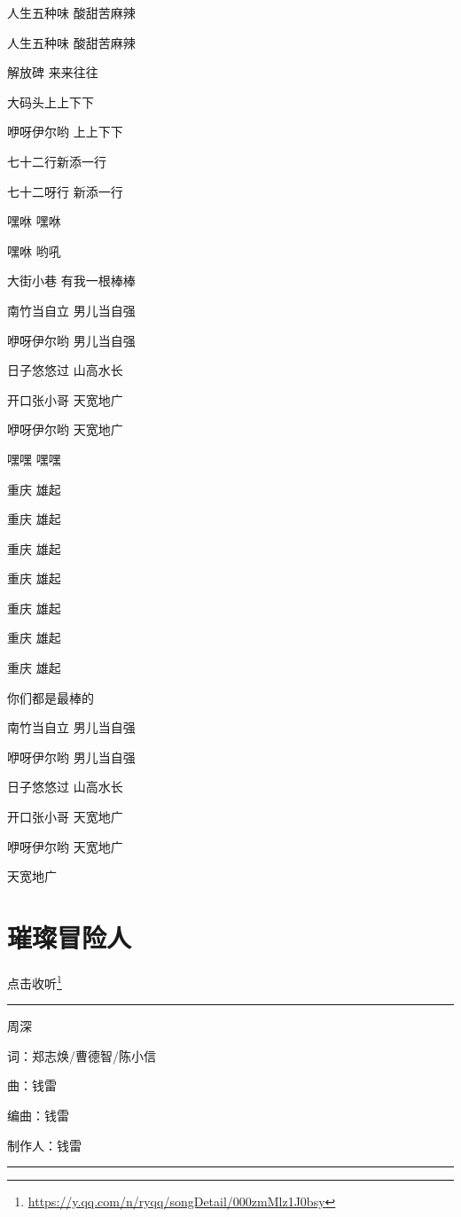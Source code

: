 \documentclass[]{ctexbook}
\renewcommand{\href}[2]{#2\footnote{\url{#1}}}
\begin{document}
人生五种味 酸甜苦麻辣

人生五种味 酸甜苦麻辣

解放碑 来来往往

大码头上上下下

咿呀伊尔哟 上上下下

七十二行新添一行

七十二呀行 新添一行

嘿咻 嘿咻

嘿咻 哟吼

大街小巷 有我一根棒棒

南竹当自立 男儿当自强

咿呀伊尔哟 男儿当自强

日子悠悠过 山高水长

开口张小哥 天宽地广

咿呀伊尔哟 天宽地广

嘿嘿 嘿嘿

重庆 雄起

重庆 雄起

重庆 雄起

重庆 雄起

重庆 雄起

重庆 雄起

重庆 雄起

你们都是最棒的

南竹当自立 男儿当自强

咿呀伊尔哟 男儿当自强

日子悠悠过 山高水长

开口张小哥 天宽地广

咿呀伊尔哟 天宽地广

天宽地广

\section*{璀璨冒险人}\label{adventurers}


\href{https://y.qq.com/n/ryqq/songDetail/000zmMlz1J0bsy}{点击收听}

\begin{center}\rule{0.5\linewidth}{0.5pt}\end{center}

周深

词：郑志焕/曹德智/陈小信

曲：钱雷

编曲：钱雷

制作人：钱雷

\begin{center}\rule{0.5\linewidth}{0.5pt}\end{center}
\end{document}
